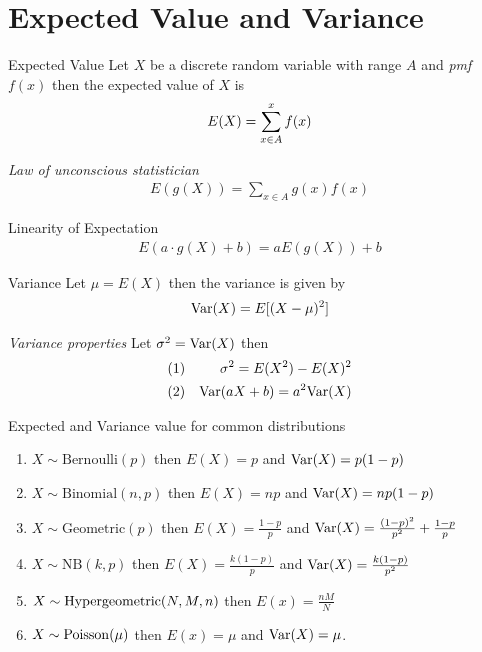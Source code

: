 \documentclass[16pt,a4paper]{article}
\begin{document}
\section{Expected Value and Variance}
\begin{defn}{Expected Value}
    Let $X$ be a discrete random variable with range $A$ and \textit{pmf} $f(x)$ then the expected value of $X$ is 
    \begin{align*}
        E(X) = \sum\limits_{x\in A}^{x}f(x) 
    \end{align*} 
\end{defn}
\begin{thm}{\textit{Law of unconscious statistician}}
    \begin{align*}
        E(g(X)) = \sum_{x\in A}g(x)f(x) 
    \end{align*}
\end{thm}
\begin{thm}{Linearity of Expectation}
    \begin{align*}
        E(a\cdot g(X) + b) = aE(g(X)) + b
    \end{align*}
\end{thm}
\begin{defn}{Variance}
    Let $\mu = E(X)$ then the variance is given by 
    \begin{align*}
        \mathrm{Var}(X) = E[(X-\mu)^2]
    \end{align*}
\end{defn}
\begin{thm}{\textit{Variance properties}}
    Let $\sigma^2 = \mathrm{Var}(X)$ then 
    \begin{align*}
        (1) && \sigma^2 = E(X^2) - E(X)^2\\
        (2) && \mathrm{Var}(aX+b) = a^2\mathrm{Var}(X)
    \end{align*}
\end{thm}



\begin{thm}{Expected and Variance value for common distributions}
    \begin{enumerate}[(1)]
        \item $X \sim \mathrm{Bernoulli}(p)$ then $E(X)  =  p$ and $\mathrm{Var}(X) = p(1-p)$
        \item $X \sim \mathrm{Binomial}(n,p)$ then $E(X)  =  np$ and $\mathrm{Var}(X) = np(1-p)$
        \item $X \sim \mathrm{Geometric}(p)$ then $E(X)  =  \frac{1-p}{p}$ and $\mathrm{Var}(X) = \frac{(1-p)^2}{p^2} + \frac{1-p}{p}$
        \item $X \sim \mathrm{NB}(k,p)$ then $E(X) = \frac{k(1-p)}{p}$ and $\mathrm{Var}(X) = \frac{k(1-p)}{p^2}$
        \item $X\sim {\rm Hypergeometric}(N,M,n)$ then $E(x) = \frac{nM}{N}$
        \item $X\sim {\rm Poisson}(\mu)$ then $E(x) = \mu$ and $\mathrm{Var}(X) = \mu$.
    \end{enumerate}
\end{thm}
\newpage
\end{document}
